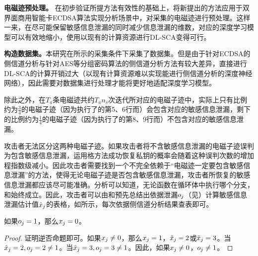 {	\textbf{电磁迹预处理。}
	在初步验证所提方法有效性的基础上，将新提出的方法应用于双界面商用智能卡ECDSA算法实现分析场景中，对采集的电磁迹进行预处理。这样一来，在尽可能保留敏感信息泄漏的同时减少信息泄漏的维数，对应的深度学习模型可以有效地缩小，使用以现有的计算资源进行DL-SCA变得可行。
	
	\textbf{构造数据集。}本研究在所示的采集条件下采集了数据集。但是由于针对ECDSA的侧信道分析与针对AES等分组密码算法的侧信道分析方法有较大差异，直接进行DL-SCA的计算开销过大（以现有计算资源难以实现能进行侧信道分析的深度神经网络），因此需要对数据集进行处理才能将更好地适配深度学习模型。
	
	除此之外，在$T_a$条电磁迹共约$T_an_s$次迭代所对应的电磁子迹中，实际上只有比例约为$\frac34$的电磁子迹（因为执行了的第5、6行而）会包含对应的敏感信息泄漏，剩下的比例约为$\frac14$的电磁子迹（因为执行了的第8、9行而）不包含对应的敏感信息泄漏。
	
	攻击者无法区分这两种电磁子迹。如果攻击者将不含敏感信息泄漏的电磁子迹误判为包含敏感信息泄漏，运用格方法成功恢复私钥的概率会随着这种误判次数的增加程指数级减小。因此攻击者需要找到一个不完全依赖于“电磁迹一定要包含敏感信息泄漏”的方法，使得无论电磁子迹是否包含敏感信息泄漏，攻击者所恢复的敏感信息泄漏都应该尽可能准确。分析可以知道，无论函数在循环体中执行哪个分支，和始终成立。因此，攻击者可以由和预先总结出依据泄漏$o_j$（见）计算敏感信息泄漏估计值$\hat {x}_j$的表格，如所示，每次依据侧信道分析结果查表即可。
	
	\begin{corollary}\label{cor:highbitinfo}
		如果$o_j=1$，那么$x_j=0$。
	\end{corollary}
	\begin{proof}
		证明逆否命题即可。如果$x_j\neq0$，那么$x_j=1$，$\tilde {x}_j=2$或$\tilde {x}_j=3$。当$\tilde {x}_j=2,o_j=2\neq1$。当$\tilde {x}_j=3,o_j=3\neq1$。因此，如果$x_j\neq0$，$o_j\neq1$。
	\end{proof}

}
